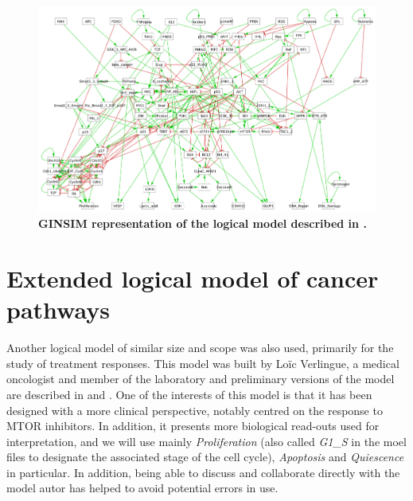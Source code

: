\documentclass[a4paper,12pt,twoside,onecolumn,openright,final,oldfontcommands]{memoir}
\begin{document}
\begin{figure}

{\centering \includegraphics[width=0.9\linewidth]{fig/Fumia2013} 

}

\caption[Graphical abstract of PROFILE method to personalize logical models with omics data]{\textbf{GINSIM representation of the logical model
described in \citet{fumia2013boolean}.}}\label{fig:Fumia}
\end{figure}




\section{Extended logical model of cancer
pathways}\label{appendix-verlingue}

Another logical model of similar size and scope was also used, primarily
for the study of treatment responses. This model was built by Loïc
Verlingue, a medical oncologist and member of the laboratory and
preliminary versions of the model are described in
\citet{verlingue2016comprehensive} and \citet{verlingue2016silico}. One
of the interests of this model is that it has been designed with a more
clinical perspective, notably centred on the response to MTOR
inhibitors. In addition, it presents more biological read-outs used for
interpretation, and we will use mainly \emph{Proliferation} (also called
\emph{G1\_S} in the moel files to designate the associated stage of the
cell cycle), \emph{Apoptosis} and \emph{Quiescence} in particular. In
addition, being able to discuss and collaborate directly with the model
autor has helped to avoid potential errors in use.
\end{document}
